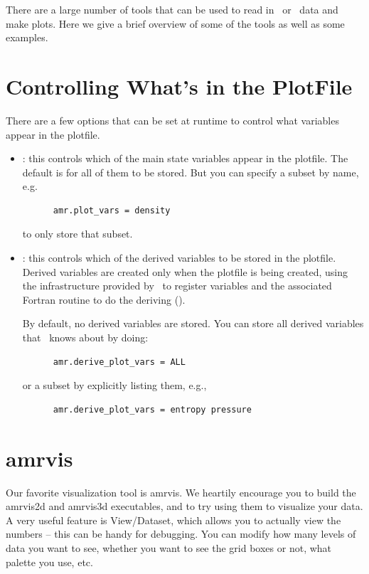 There are a large number of tools that can be used to read in \castro\
or \boxlib\ data and make plots.  Here we give a brief overview of some
of the tools as well as some examples.

\section{Controlling What's in the PlotFile}

There are a few options that can be set at runtime to control what
variables appear in the plotfile.

\begin{itemize}

  \item {} : this controls which of the main
    state variables appear in the plotfile.  The default is for all of
    them to be stored.  But you can specify a subset by name, e.g.
    \begin{verbatim}
      amr.plot_vars = density
    \end{verbatim}
    to only store that subset.

  \item {} : this controls which of the
    derived variables to be stored in the plotfile.  Derived variables
    are created only when the plotfile is being created, using the
    infrastructure provided by \boxlib\ to register variables and the
    associated Fortran routine to do the deriving
    ().

    By default, no derived variables are stored.  You can store all
    derived variables that \castro\ knows about by doing:
    \begin{verbatim}
      amr.derive_plot_vars = ALL
    \end{verbatim}
    or a subset by explicitly listing them, e.g., 
    \begin{verbatim}
      amr.derive_plot_vars = entropy pressure
    \end{verbatim}

\end{itemize}


\section{amrvis}
Our favorite visualization tool is amrvis. We heartily encourage you
to build the amrvis2d and amrvis3d executables, and to try using them
to visualize your data. A very useful feature is View/Dataset, which
allows you to actually view the numbers -- this can be handy for
debugging. You can modify how many levels of data you want to see,
whether you want to see the grid boxes or not, what palette you use,
etc.

